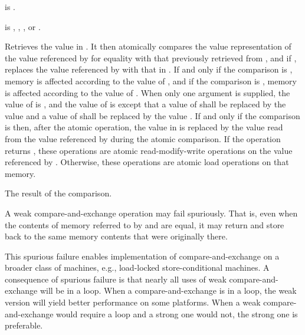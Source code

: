 \begin{itemdescr}
\pnum
\constraints
{} is .

\pnum
\expects
{} is
,
,
, or
.

\pnum
\effects
Retrieves the value in .
It then atomically compares the value representation of
the value referenced by  for equality
with that previously retrieved from ,
and if , replaces the value referenced by 
with that in .
If and only if the comparison is ,
memory is affected according to the value of , and
if the comparison is ,
memory is affected according to the value of .
When only one  argument is supplied,
the value of  is , and
the value of  is 
except that a value of  shall be replaced by
the value  and
a value of  shall be replaced by
the value .
If and only if the comparison is  then,
after the atomic operation,
the value in  is replaced by
the value read from the value referenced by 
during the atomic comparison.
If the operation returns ,
these operations are atomic read-modify-write operations
on the value referenced by .
Otherwise, these operations are atomic load operations on that memory.

\pnum
\returns
The result of the comparison.

\pnum
\remarks
A weak compare-and-exchange operation may fail spuriously.
That is, even when the contents of memory referred to
by  and  are equal,
it may return  and
store back to  the same memory contents
that were originally there.
\begin{note}
This spurious failure enables implementation of compare-and-exchange
on a broader class of machines, e.g., load-locked store-conditional machines.
A consequence of spurious failure is
that nearly all uses of weak compare-and-exchange will be in a loop.
When a compare-and-exchange is in a loop,
the weak version will yield better performance on some platforms.
When a weak compare-and-exchange would require a loop and
a strong one would not, the strong one is preferable.
\end{note}
\end{itemdescr}

